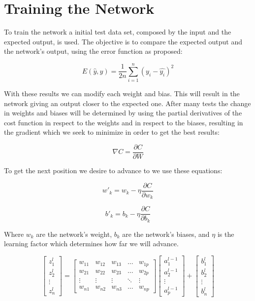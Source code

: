 \documentclass[a4paper, 12pt]{amsart}
\begin{document}
\section{Training the Network}
To train the network a initial test data set, composed by the input and the expected output, is used. The objective is to compare the expected output and the network's output, using the error function as proposed:

\[E(\hat{y}, y) = \frac{1}{2n}\sum_{i=1}^{n} (y_i-\hat{y_i})^2\]


With these results we can modify each weight and bias. This will result in the network giving an output closer to the expected one. After many tests the change in weights and biases will be determined by using the partial derivatives of the cost function in respect to the weights and in respect to the biases, resulting in the gradient which we seek to minimize in order to get the best results:

\[\nabla C = \frac{\partial C}{\partial W}\]

To get the next position we desire to advance to we use these equations:

\[ w'_k = w_k - \eta\frac{\partial C}{\partial w_k}\]


\[b'_k = b_k - \eta\frac{\partial C}{\partial b_k}\]

Where $w_k$ are the network's weight, $b_k$ are the network's biases, and $\eta$ is the learning factor which determines how far we will advance.


\[
  \begin{bmatrix}
    z_{1}^{l}\\
    z_{2}^{l}\\
    \vdots\\
    z_{n}^{l}
  \end{bmatrix}
   =
   \begin{bmatrix}
    w_{11} & w_{12} & w_{13} & \dots  & w_{1p} \\
    w_{21} & w_{22} & w_{23} & \dots  & w_{2p} \\
    \vdots & \vdots & \vdots & \ddots & \vdots \\
    w_{n1} & w_{n2} & w_{n3} & \dots  & w_{np}
\end{bmatrix}
   \begin{bmatrix}
    a_{1}^{l-1}\\
    a_{2}^{l-1}\\
    \vdots\\
    a_{p}^{l-1}
  \end{bmatrix}
  +
  \begin{bmatrix}
    b_{1}^{l}\\
    b_{2}^{l}\\
    \vdots\\
    b_{n}^{l}
  \end{bmatrix}
\]
\end{document}
